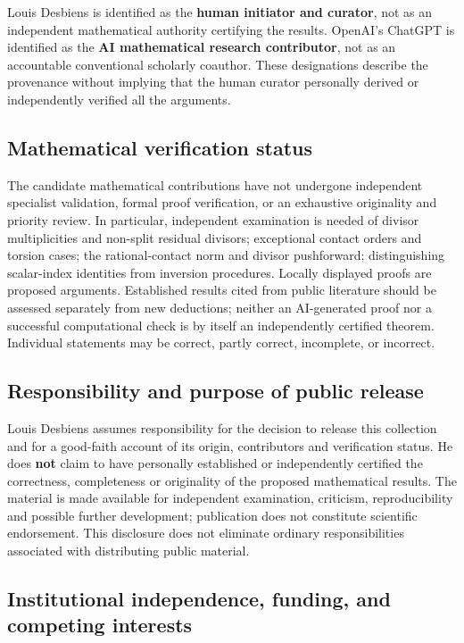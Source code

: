 \documentclass[
  11pt,
  a4paper,
]{article}
\begin{document}
Louis Desbiens is identified as the \textbf{human initiator and
curator}, not as an independent mathematical authority certifying the
results. OpenAI's ChatGPT is identified as the \textbf{AI mathematical
research contributor}, not as an accountable conventional scholarly
coauthor. These designations describe the provenance without implying
that the human curator personally derived or independently verified all
the arguments.

\subsection{Mathematical verification
status}\label{mathematical-verification-status}

The candidate mathematical contributions have not undergone independent
specialist validation, formal proof verification, or an exhaustive
originality and priority review. In particular, independent examination
is needed of divisor multiplicities and non-split residual divisors;
exceptional contact orders and torsion cases; the rational-contact norm
and divisor pushforward; distinguishing scalar-index identities from
inversion procedures. Locally displayed proofs are proposed arguments.
Established results cited from public literature should be assessed
separately from new deductions; neither an AI-generated proof nor a
successful computational check is by itself an independently certified
theorem. Individual statements may be correct, partly correct,
incomplete, or incorrect.

\subsection{Responsibility and purpose of public
release}\label{responsibility-and-purpose-of-public-release}

Louis Desbiens assumes responsibility for the decision to release this
collection and for a good-faith account of its origin, contributors and
verification status. He does \textbf{not} claim to have personally
established or independently certified the correctness, completeness or
originality of the proposed mathematical results. The material is made
available for independent examination, criticism, reproducibility and
possible further development; publication does not constitute scientific
endorsement. This disclosure does not eliminate ordinary
responsibilities associated with distributing public material.

\subsection{Institutional independence, funding, and competing
interests}\label{institutional-independence-funding-and-competing-interests}
\end{document}

